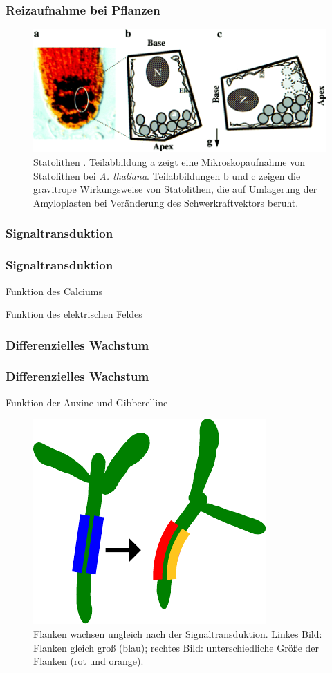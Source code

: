 \documentclass[aspectratio=169]{beamer}
\begin{document}
	\begin{frame}
		\frametitle{Reizaufnahme bei Pflanzen}
		\begin{figure}[H]
			\centering 
			\includegraphics[width = 0.75\linewidth]{images/Statolithen2.png}
			\caption{Statolithen \parencite[345]{Chen1999}. Teilabbildung a zeigt eine Mikroskopaufnahme von Statolithen bei \emph{A. thaliana}. Teilabbildungen b und c zeigen die gravitrope Wirkungsweise von Statolithen, die auf Umlagerung der Amyloplasten bei Veränderung des Schwerkraftvektors beruht. \label{Statolithen}}
		\end{figure} 
	\end{frame}
			
	\subsubsection{Signaltransduktion}
		
	\begin{frame}
		\frametitle{Signaltransduktion}
		Funktion des Calciums 
		
		Funktion des elektrischen Feldes
	\end{frame}
			
	\subsubsection{Differenzielles Wachstum}
		
	\begin{frame}
		\frametitle{Differenzielles Wachstum}
		
		Funktion der Auxine und Gibberelline
		\begin{figure}[H]
			\centering 
			\includegraphics[width = 0.4\linewidth]{images/newdiff.pdf}
			\caption{Flanken wachsen ungleich nach der Signaltransduktion. Linkes Bild: Flanken gleich groß (blau); rechtes Bild: unterschiedliche Größe der Flanken (rot und orange).}
		\end{figure} 
	\end{frame}
	
\end{document}
